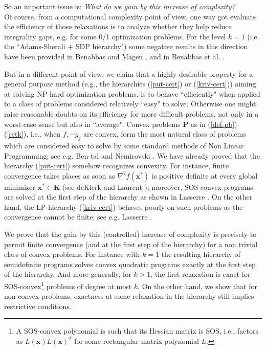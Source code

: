 \documentclass[11pt]{article}
\numberwithin{equation}{section}
\def\x{\mathbf{x}}
\def\K{\mathbf{K}}
\def\P{\mathbf{P}}
\begin{document}
So an important issue is: {\it What do we gain by this increase of complexity?}\\

Of course, from a computational complexity point of view, one way got evaluate the efficiency of 
those relaxations is to analyze whether they help reduce integrality gaps, e.g. for some
0/1 optimization problems. For the level $k=1$ (i.e. the ``Adams-Sherali + SDP hierarchy") some negative results in this direction have been provided
in Benabbas and Magen \cite{benabbas2}, and in  Benabbas et al. \cite{benabbas1}.

But in a  different point of view, we claim that a highly desirable property for a general purpose method (e.g., the hierarchies (\ref{put-cert}) or (\ref{kriv-cert}))
aiming at solving NP-hard optimization problems, is to behave ``efficiently" when 
applied to a class of problems considered relatively ``easy" to solve. Otherwise one might raise reasonable doubts on  its
efficiency for more difficult problems, not only in a worst-case sense but also  in ``average". Convex problems $\P$ as in (\ref{def-pb})-(\ref{setk}), i.e., when $f,-g_j$ are convex,
form the most natural class of problems which are considered easy to solve by some standard methods of Non Linear Programming;
see e.g. Ben-tal and Nemirovski \cite{Bental01}.
We have already proved that the hierarchy 
(\ref{put-cert}) somehow recognizes convexity. For instance, finite convergence takes places as soon as $\nabla^2f(\x^*)$
is positive definite at every global minimizer $\x^*\in\K$ (see deKlerk and Laurent \cite{deklerk-convex}); moreover, SOS-convex programs are solved at the first step of the hierarchy as shown in Lasserre \cite{lasserre-convex}.
On the other hand, the LP-hierarchy (\ref{kriv-cert}) behaves poorly on such problems as the convergence cannot be finite; see e.g. Lasserre \cite{lasserre-imperial,Lasserre02a}.

We prove that the gain by this (controlled) increase of complexity is precisely to permit finite convergence (and at the first step of the hierarchy)
for a non trivial class of convex problems. For instance with $k=1$ the resulting hierarchy of semidefinite programs
solves convex quadratic programs exactly at the first step of the hierarchy. And more generally,
for $k>1$, the first relaxation is exact for SOS-convex\footnote{A SOS-convex polynomial is such that its Hessian matrix is SOS, i.e., 
factors as $L(\x)L(\x)^T$ for some rectangular matrix polynomial $L$.}
 problems of degree at most $k$.  On the other hand, 
 we show that for non convex problems,  exactness at some relaxation in the hierarchy still implies restrictive
 conditions.
 
\end{document}
